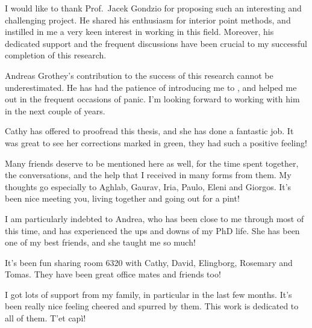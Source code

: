 
%
%

I would like to thank Prof.~Jacek Gondzio for proposing such an
interesting and challenging project. 
He shared his enthusiasm for interior point methods, and 
instilled in me a very keen interest in working in this field.
Moreover, his dedicated support and the frequent discussions
have been crucial to my successful
completion of this research.

Andreas Grothey's contribution to the success of this research
cannot be underestimated. 
He has had the patience of introducing me to \OOPS, and helped me out
in the frequent occasions of panic.
I'm looking forward to working with him in the next couple of years.

Cathy has offered to proofread this thesis, and she
has done a fantastic job. 
It was great to see her corrections marked in green, they had such a 
positive feeling!

Many friends deserve to be mentioned here as well, for the time spent together,
the conversations, and the help that I received in many forms from them.
My thoughts go especially to Aghlab, Gaurav, Iria, Paulo, Eleni and Giorgos. 
It's been nice meeting you, living together and going out for a pint!

I am particularly indebted to Andrea, who has been close to me through
most of this time, and has experienced the ups and downs of my PhD life.
She has been one of my best friends, and she taught me so much!

It's been fun sharing room 6320 with Cathy, David, Elingborg, Rosemary
and Tomas. They have been great office mates and
friends too!

I got lots of support from my family, in particular in the last few months.
It's been really nice feeling cheered and spurred by them.
This work is dedicated to all of them. T'et cap\`i!
